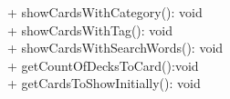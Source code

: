 { 
    + showCardsWithCategory(): void \\ 
    + showCardsWithTag(): void\\
    + showCardsWithSearchWords(): void \\
    + getCountOfDecksToCard():void\\
    + getCardsToShowInitially(): void\\
}{}